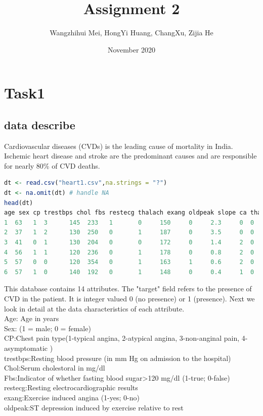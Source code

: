 \documentclass{article}
\title{Assignment 2}
\author{Wangzhihui Mei, HongYi Huang, ChangXu, Zijia He}
\date{November 2020}
\begin{document}
\maketitle
\section{Task1}
\subsection{data describe}
Cardiovascular diseases (CVDs) is the leading cause of mortality in India. Ischemic heart disease and stroke are the predominant causes and are responsible for nearly 80\% of CVD deaths. 

\begin{lstlisting}[language=R]
dt <- read.csv("heart1.csv",na.strings = "?")
dt <- na.omit(dt) # handle NA
head(dt)
age sex cp trestbps chol fbs restecg thalach exang oldpeak slope ca thal target
1  63   1  3      145  233   1       0     150     0     2.3     0  0    1      1
2  37   1  2      130  250   0       1     187     0     3.5     0  0    2      1
3  41   0  1      130  204   0       0     172     0     1.4     2  0    2      1
4  56   1  1      120  236   0       1     178     0     0.8     2  0    2      1
5  57   0  0      120  354   0       1     163     1     0.6     2  0    2      1
6  57   1  0      140  192   0       1     148     0     0.4     1  0    1      1
\end{lstlisting} 
This database contains 14 attributes. The "target" field refers to the presence of CVD in the patient. It is
integer valued 0 (no presence) or 1 (presence). Next we look in detail at the data characteristics of each attribute.
\\
Age: Age in years\\
Sex: (1 = male; 0 = female)\\
CP:Chest pain type(1-typical angina, 2-atypical angina, 3-non-anginal	pain, 4-asymptomatic )\\
trestbps:Resting blood pressure (in mm Hg on admission to the hospital)\\
Chol:Serum cholestoral in mg/dl\\
Fbs:Indicator of whether fasting blood sugar>120 mg/dl (1-true; 0-false)\\
restecg:Resting electrocardiographic results\\
exang:Exercise induced angina (1-yes; 0-no)\\
oldpeak:ST depression induced by exercise relative to rest\\
\end{document}
